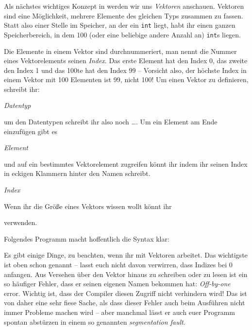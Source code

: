 
Als nächstes wichtiges Konzept in \Cpp werden wir uns \emph{Vektoren} anschauen.
Vektoren sind eine Möglichkeit, mehrere Elemente des gleichen Typs zusammen zu fassen.
Statt also einer Stelle im Speicher, an der ein \texttt{int} liegt, habt ihr einen ganzen Speicherbereich, in dem 100 (oder eine beliebige andere Anzahl an) \texttt{int}s liegen.

Die Elemente in einem Vektor sind durchnummeriert, man nennt die Nummer eines Vektorelements seinen \emph{Index}.
Das erste Element hat den Index 0, das zweite den Index 1 und das 100te hat den Index 99 -- Vorsicht also, der höchste Index in einem Vektor mit 100 Elementen ist 99, nicht 100!
Um einen Vektor zu definieren, schreibt ihr:
\begin{center}
	\emph{Datentyp}
\end{center}
um den Datentypen schreibt ihr also noch \dots\cppinline{>}.
Um ein Element am Ende einzufügen gibt es
\begin{center}
	\emph{Element}\cppinline{);}
\end{center}
und auf ein bestimmtes Vektorelement zugreifen könnt ihr indem ihr seinen Index in eckigen Klammern hinter den Namen schreibt.
\begin{center}
	\cppinline{einvektor[}\emph{Index}\cppinline{]}
\end{center}
Wenn ihr die Größe eines Vektors wissen wollt könnt ihr
\begin{center}
\end{center}
verwenden.

Folgendes Programm macht hoffentlich die Syntax klar:


Es gibt einige Dinge, zu beachten, wenn ihr mit Vektoren arbeitet.
Das wichtigste ist oben schon genannt -- lasst euch nicht davon verwirren, dass Indizes bei 0 anfangen.
Aus Versehen über den Vektor hinaus zu schreiben oder zu lesen ist ein so häufiger Fehler, dass er seinen eigenen Namen bekommen hat: \emph{Off-by-one} error.
Wichtig ist, dass der Compiler diesen Zugriff nicht verhindern wird!
Das ist von daher eine sehr fiese Sache, als dass dieser Fehler auch beim Ausführen nicht immer Probleme machen wird -- aber manchmal lässt er auch euer Programm spontan abstürzen in einem so genannten \emph{segmentation fault}.


